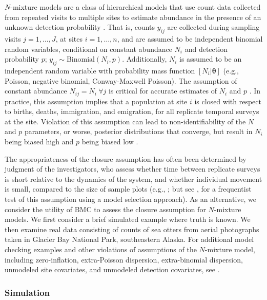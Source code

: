 \documentclass[12pt,english]{article}
\begin{document}
\begin{spacing}{1.9}
$N$-mixture models are a class of hierarchical models that use count
data collected from repeated visits to multiple sites to estimate
abundance in the presence of an unknown detection probability
\citep{Royle2004a}. That is, counts $y_{ij}$ are collected during
sampling visits $j=1,\ldots,J$, at sites $i=1,\ldots,n$, and are
assumed to be independent binomial random variables, conditional on
constant abundance $N_i$ and detection probability $p$;
$y_{ij} \sim \text{Binomial}(N_i,p)$. Additionally, $N_i$ is assumed
to be an independent random variable with probability mass function
$[N_i|\boldsymbol{\theta}]$ (e.g., Poisson, negative binomial,
Conway-Maxwell Poisson).  The assumption of constant abundance
$N_{ij}=N_i~ \forall j$ is critical for accurate estimates of $N_i$
and $p$ \citep{BarkerEtAl2017}. In practice, this assumption implies
that a population at site $i$ is closed with respect to births,
deaths, immigration, and emigration, for all replicate temporal
surveys at the site. Violation of this assumption can lead to
non-identifiability of the $N$ and $p$ parameters, or worse, posterior
distributions that converge, but result in $N_i$ being biased high and
$p$ being biased low \citep[Appendix C]{KeryRoyle2016}.

The appropriateness of the closure assumption has often been
determined by judgment of the investigators, who assess whether time
between replicate surveys is short relative to the dynamics of the
system, and whether individual movement is small, compared to the size
of sample plots (e.g., \citealt{efford2012occupancy}; but see
\citealt{DailMadsen2011}, for a frequentist test of this assumption
using a model selection approach). As an alternative, we consider the
utility of BMC to assess the closure assumption for $N$-mixture
models. We first consider a brief simulated example where truth is
known. We then examine real data consisting of counts of sea otters
from aerial photographs taken in Glacier Bay National Park,
southeastern Alaska. For additional model checking examples and other
violations of assumptions of the $N$-mixture model, including
zero-inflation, extra-Poisson dispersion, extra-binomial dispersion,
unmodeled site covariates, and unmodeled detection covariates, see
\citet[][section 6.8]{KeryRoyle2016}.

\subsubsection*{Simulation}


\end{spacing}
\end{document}
